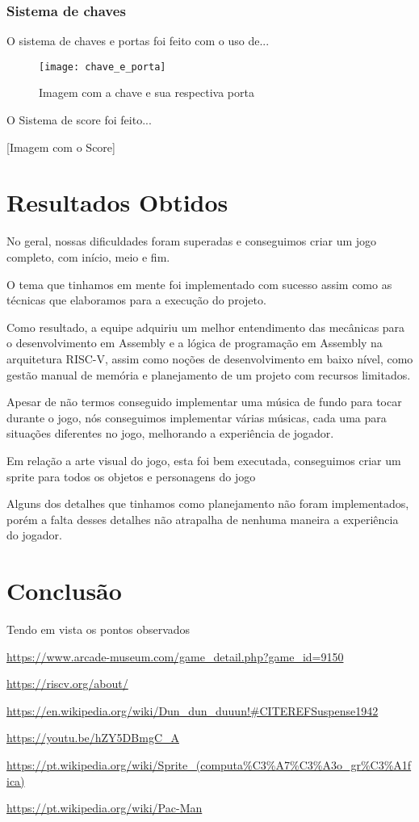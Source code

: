 \documentclass[conference]{IEEEtran}
\begin{document}
\subsubsection{Sistema de chaves}  
O sistema de chaves e portas foi feito com o uso de...

\begin{figure}[H]
\centering
\texttt{[image: chave\_e\_porta]}
\caption{Imagem com a chave e sua respectiva porta}
\end{figure}

O Sistema de score foi feito... 

[Imagem com o Score]

\section{Resultados Obtidos}
No geral, nossas dificuldades foram superadas e conseguimos criar um jogo completo, com início, meio e fim. 

O tema que tinhamos em mente foi implementado com sucesso assim como as técnicas que elaboramos para a execução do projeto. 

Como resultado, a equipe adquiriu um melhor entendimento das mecânicas para o desenvolvimento em Assembly e a lógica de programação em Assembly na arquitetura RISC-V, assim como noções de desenvolvimento em baixo nível, como gestão manual de memória e planejamento de um projeto com recursos limitados.

Apesar de não termos conseguido implementar uma música de fundo para tocar durante o jogo, nós conseguimos implementar várias músicas, cada uma para situações diferentes no jogo, melhorando a experiência de jogador.

Em relação a arte visual do jogo, esta foi bem executada, conseguimos criar um sprite\textsuperscript{\cite{b5}} para todos os objetos e personagens do jogo 

Alguns dos detalhes que tinhamos como planejamento não foram implementados, porém a falta desses detalhes não atrapalha de nenhuma maneira a experiência do jogador.

\section*{Conclusão}

Tendo em vista os pontos observados

\begin{thebibliography}{00}
 \url{https://www.arcade-museum.com/game_detail.php?game_id=9150} 

 \url{https://riscv.org/about/}

 \url{https://en.wikipedia.org/wiki/Dun_dun_duuun!\#CITEREFSuspense1942}

 \url{https://youtu.be/hZY5DBmgC_A}

 \url{https://pt.wikipedia.org/wiki/Sprite_(computa%C3%A7%C3%A3o_gr%C3%A1fica)}

 \url{https://pt.wikipedia.org/wiki/Pac-Man}

\end{thebibliography}
\vspace{12pt}
\end{document}
